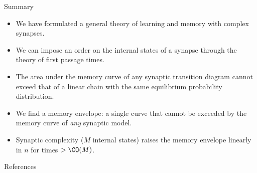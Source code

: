 \documentclass[final,hyperref={pdfpagelabels=false,bookmarks=false}]{beamer}
\begin{document}
\begin{frame}{}
\begin{columns}[t]
\begin{column}{0.3\linewidth}
%
%



\begin{block}{Summary}
%
  \begin{itemize}
    \item We have formulated a general theory of learning and memory with complex synapses.
    \item We can impose an order on the internal states of a synapse through the theory of first passage times.
    \item The area under the memory curve of any synaptic transition diagram cannot exceed that of a linear chain with the same equilibrium probability distribution.
    \item We find a memory envelope: a single curve that cannot be exceeded by the memory curve of \emph{any} synaptic model.
    \item    Synaptic complexity ($M$ internal states) raises the memory envelope linearly in $n$ for times $> \CO(M)$.
  \end{itemize}
%
\end{block}


\begin{block}{References}
%
 {\tiny
 
 
 }
%
\end{block}


\end{column}
\end{columns}
\end{frame}
\end{document}
